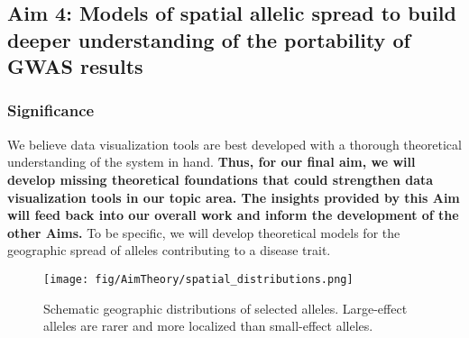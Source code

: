 \documentclass[SpecificAims_and_Proposal]{subfiles}
\begin{document}
%
%




\subsection*{Aim 4: Models of spatial allelic spread to build deeper understanding of the portability of GWAS results }


\subsubsection*{Significance}\label{significance}


We believe data visualization tools are best developed with a thorough theoretical understanding of the system in hand.  \textbf{Thus, for our final aim, we will develop missing theoretical foundations that could strengthen data visualization tools in our topic area.  The insights provided by this Aim will feed back into our overall work and inform the development of the other Aims.}  To be specific, we will develop theoretical models for the geographic spread of alleles contributing to a disease trait.

\begin{wrapfigure}{r}{0.25\textwidth}
 \vspace{-20pt}
\texttt{[image: fig/AimTheory/spatial\_distributions.png]}
\vspace{-5pt}
\caption{\footnotesize Schematic geographic distributions of selected alleles. Large-effect alleles are rarer and more localized than small-effect alleles.}
\vspace{-10pt}
\label{fig:spatial_distributions}
\end{wrapfigure}
\end{document}
